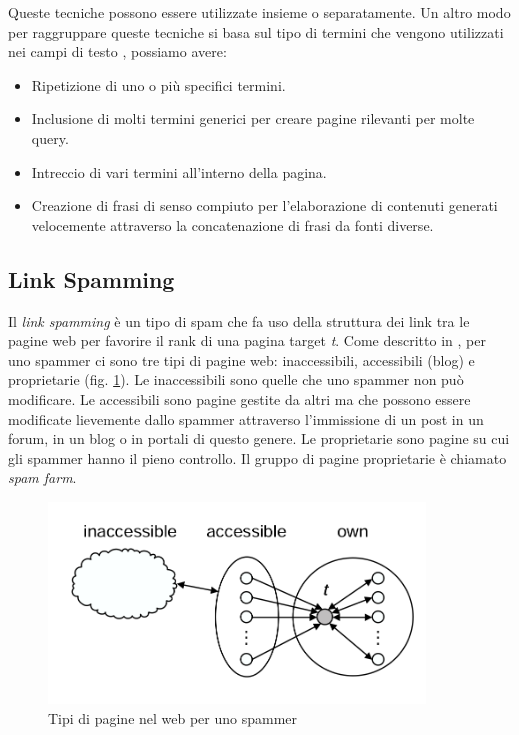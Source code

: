 Queste tecniche possono essere utilizzate insieme o separatamente. Un altro modo per raggruppare queste tecniche si basa sul tipo di termini che vengono utilizzati nei campi di testo \cite{ilprints646}, possiamo avere:
\begin{itemize}
\item Ripetizione di uno o più specifici termini.
\item Inclusione di molti termini generici per creare pagine rilevanti per molte query.
\item Intreccio di vari termini all'interno della pagina.
\item Creazione di frasi di senso compiuto per l'elaborazione di contenuti generati velocemente attraverso la concatenazione di frasi da fonti diverse.
\end{itemize}

\subsection{Link Spamming}
Il \textit{link spamming} è un tipo di spam che fa uso della struttura dei link tra le pagine web per favorire il rank di una pagina target \textit{t}.
Come descritto in \cite{ilprints646}, per uno spammer ci sono tre tipi di pagine web: inaccessibili, accessibili (blog) e proprietarie (fig. \ref{fig:tipologiaPagine}). Le inaccessibili sono quelle che uno spammer non può modificare. Le accessibili sono pagine gestite da altri ma che possono essere modificate lievemente dallo spammer attraverso l'immissione di un post in un forum, in un blog o in portali di questo genere. Le proprietarie sono pagine su cui gli spammer hanno il pieno controllo. Il gruppo di pagine proprietarie è chiamato \textit{spam farm}.
\begin{figure} 
 \centering
 \includegraphics[width=10cm]{immagini/tipologiaPagine}
 \caption{Tipi di pagine nel web per uno spammer}
 \label{fig:tipologiaPagine}
\end{figure}

